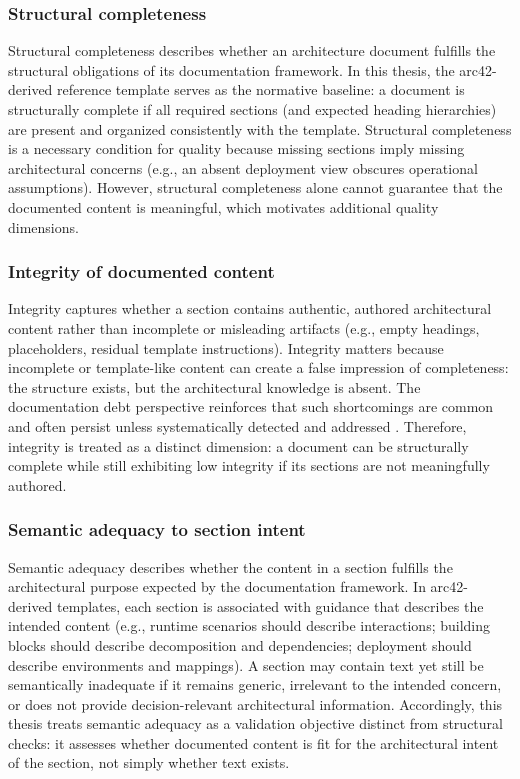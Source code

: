 \subsubsection{Structural completeness}
Structural completeness describes whether an architecture document fulfills the structural obligations of its documentation framework. In this thesis, the arc42-derived reference template serves as the normative baseline: a document is structurally complete if all required sections (and expected heading hierarchies) are present and organized consistently with the template.
Structural completeness is a necessary condition for quality because missing sections imply missing architectural concerns (e.g., an absent deployment view obscures operational assumptions). However, structural completeness alone cannot guarantee that the documented content is meaningful, which motivates additional quality dimensions.

\subsubsection{Integrity of documented content}
Integrity captures whether a section contains authentic, authored architectural content rather than incomplete or misleading artifacts (e.g., empty headings, placeholders, residual template instructions). Integrity matters because incomplete or template-like content can create a false impression of completeness: the structure exists, but the architectural knowledge is absent.
The documentation debt perspective reinforces that such shortcomings are common and often persist unless systematically detected and addressed \cite{mendes_doc_td}. Therefore, integrity is treated as a distinct dimension: a document can be structurally complete while still exhibiting low integrity if its sections are not meaningfully authored.

\subsubsection{Semantic adequacy to section intent}
Semantic adequacy describes whether the content in a section fulfills the architectural purpose expected by the documentation framework. In arc42-derived templates, each section is associated with guidance that describes the intended content (e.g., runtime scenarios should describe interactions; building blocks should describe decomposition and dependencies; deployment should describe environments and mappings). A section may contain text yet still be semantically inadequate if it remains generic, irrelevant to the intended concern, or does not provide decision-relevant architectural information.
Accordingly, this thesis treats semantic adequacy as a validation objective distinct from structural checks: it assesses whether documented content is fit for the architectural intent of the section, not simply whether text exists.

